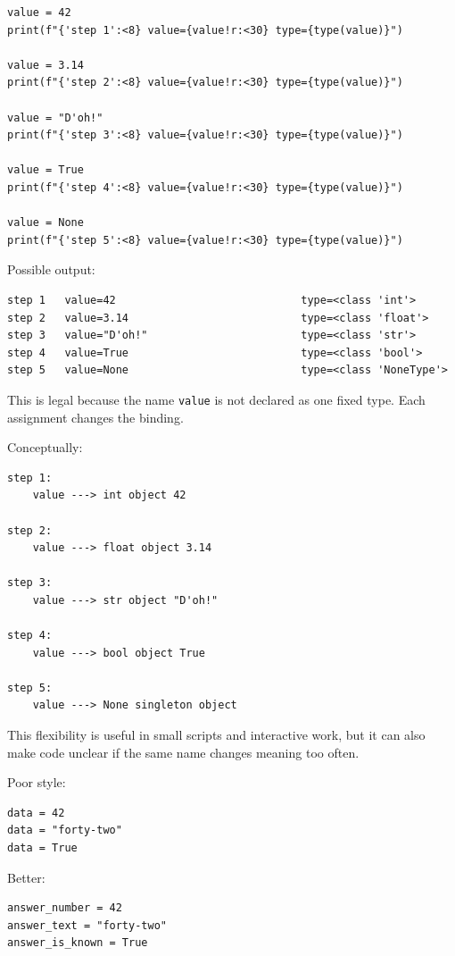 \begin{verbatim}
value = 42
print(f"{'step 1':<8} value={value!r:<30} type={type(value)}")

value = 3.14
print(f"{'step 2':<8} value={value!r:<30} type={type(value)}")

value = "D'oh!"
print(f"{'step 3':<8} value={value!r:<30} type={type(value)}")

value = True
print(f"{'step 4':<8} value={value!r:<30} type={type(value)}")

value = None
print(f"{'step 5':<8} value={value!r:<30} type={type(value)}")
\end{verbatim}

Possible output:

\begin{verbatim}
step 1   value=42                             type=<class 'int'>
step 2   value=3.14                           type=<class 'float'>
step 3   value="D'oh!"                        type=<class 'str'>
step 4   value=True                           type=<class 'bool'>
step 5   value=None                           type=<class 'NoneType'>
\end{verbatim}

This is legal because the name \texttt{value} is not declared as one fixed type. Each assignment changes the binding.

Conceptually:

\begin{verbatim}
step 1:
    value ---> int object 42

step 2:
    value ---> float object 3.14

step 3:
    value ---> str object "D'oh!"

step 4:
    value ---> bool object True

step 5:
    value ---> None singleton object
\end{verbatim}

This flexibility is useful in small scripts and interactive work, but it can also make code unclear if the same name changes meaning too often.

Poor style:

\begin{verbatim}
data = 42
data = "forty-two"
data = True
\end{verbatim}

Better:

\begin{verbatim}
answer_number = 42
answer_text = "forty-two"
answer_is_known = True
\end{verbatim}

